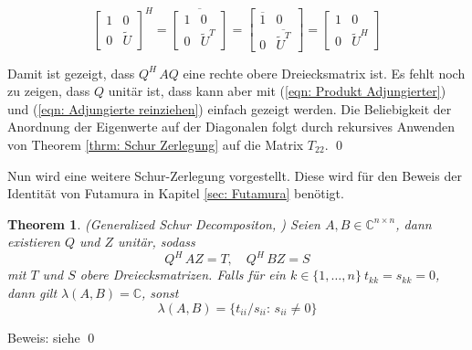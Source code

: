 \documentclass[a4paper,12pt]{report}
\newcommand{\C}{\mathbb C}
\newcommand{\1}{\mathds{1}}
\theoremstyle{plain} %
\newtheorem{theorem}{Theorem}
\theoremstyle{definition} %
\theoremstyle{remark}
\begin{document}
           \begin{equation}
            \label{eqn: Adjungierte reinziehen}
                  \begin{bmatrix}
                        1&0\\
                        0&\widetilde U
                  \end{bmatrix}^H = \overline{\begin{bmatrix}
                        1&0\\
                        0&\widetilde U^T
                  \end{bmatrix}} = \begin{bmatrix}
                        \overline{1}&0\\
                        0&\overline{\widetilde U^T}
                  \end{bmatrix} = \begin{bmatrix}
                        1&0\\
                        0&\widetilde U^H
                  \end{bmatrix}
           \end{equation}

            Damit ist gezeigt, dass $Q^H\,AQ$ eine rechte obere Dreiecksmatrix ist.
            Es fehlt noch zu zeigen, dass $Q$ unitär ist, dass kann aber mit (\ref{eqn: Produkt Adjungierter}) und (\ref{eqn: Adjungierte reinziehen}) einfach gezeigt werden.
            Die Beliebigkeit der Anordnung der Eigenwerte auf der Diagonalen folgt durch rekursives Anwenden von Theorem \ref{thrm: Schur Zerlegung} auf die Matrix $T_{22}$. \qed


            Nun wird eine weitere Schur-Zerlegung vorgestellt. Diese wird für den Beweis der Identität von Futamura in Kapitel \ref{sec: Futamura} benötigt.
            \begin{theorem}(Generalized Schur Decompositon, \cite[S. 377]{matrixGolub})
                  \label{thrm: allg Schur Zerlegung}
                  Seien $A, B \in \C^{n\times n}$, dann existieren $Q$ und $Z$ unitär, sodass
                  \begin{equation}
                        \label{eqn: allg Schur_Resultat}
                        Q^H\,AZ = T,\quad Q^H\, BZ = S
                  \end{equation}
                  mit $T$ und $S$ obere Dreiecksmatrizen.
                  Falls für ein $k\in \{1,\dots, n\}\ t_{kk}=s_{kk}=0$, dann gilt $\lambda(A, B) = \C$, sonst
                  \begin{equation}
                        \label{eqn: EW Pencil nach Schur}
                        \lambda(A, B) = \{t_{ii}/s_{ii}:\, s_{ii}\ne 0\}
                  \end{equation}
            \end{theorem}
            Beweis: siehe \cite[S. 377]{matrixGolub}\qed
\end{document}
